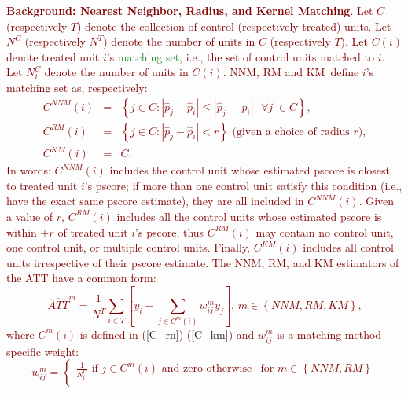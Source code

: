 \noindent \textcolor{Maroon}{\textbf{Background: Nearest Neighbor, Radius, and Kernel Matching}.
Let $C$ (respectively $T$) denote the collection of control (respectively treated) units. Let $N^{C}$ (respectively $N^{T}$) denote the number of units in $C$ (respectively $T$). Let $C\left( i\right) $ denote treated unit $i$'s \textcolor{ForestGreen}{matching set}, i.e., the set of control units matched to $i$. Let $N_{i}^{C}$ denote the number of units in $C\left( i\right) $. NNM, RM and KM\ define $i$'s matching set as, respectively: 
\begin{eqnarray}
C^{NNM}\left( i\right) &=&\left\{ j\in C:\left\vert \widehat{p}_{j}-\widehat{p}_{i}\right\vert \leq \left\vert \widehat{p}_{j^{\prime }}-\widehat{p}_{i}\right\vert \text{ }\forall j^{\prime }\in C\right\} \text{,}
\label{C_rn} \\
C^{RM}\left( i\right) &=&\left\{ j\in C:\left\vert \widehat{p}_{j}-\widehat{p}_{i}\right\vert <r\right\} \text{ (given a choice of radius }r\text{),} \label{C_rm} \\
C^{KM}\left( i\right) &=&C\text{.}  \label{C_km}
\end{eqnarray}
\noindent In words: $C^{NNM}\left( i\right)$ includes the control unit whose estimated pscore is closest to treated unit $i$'s pscore; if more than one control unit satisfy this condition (i.e., have the exact same pscore estimate), they are all included in $C^{NNM}\left( i\right)$. Given a value of $r$, $C^{RM}\left( i\right)$ includes all the control units whose estimated pscore is within $\pm r$ of treated unit $i$'s pscore, thus $C^{RM}\left( i\right)$ may contain no control unit, one control unit, or multiple control units. Finally, $C^{KM}\left( i\right)$ includes all control units irrespective of their pscore estimate.
\noindent The NNM, RM, and KM estimators of the ATT have a common form: 
\begin{equation}
\widehat{ATT}^{m} = \frac{1}{N^{T}} \sum_{i \in T}\left[y_{i}-\sum_{j \in C^{m}\left( i\right) }w_{ij}^{m}y_{j}\right] \text{, }m \in \left\{ NNM,RM,KM\right\} \text{,}  \label{ATT_m}
\end{equation}
\noindent where $C^{m}\left( i\right) $ is defined in (\ref{C_rn})-(\ref{C_km}) and $w_{ij}^{m}$ is a matching method-specific weight:
\begin{equation}
w_{ij}^{m}=\left\{ 
\begin{array}{ll}
\frac{1}{N_{i}^{C}}\text{ if }j\in C^{m}\left( i\right) \text{ and zero
otherwise} & \text{for }m\in \left\{ NNM,RM\right\} \\ 

\end{array}
\end{equation}}
